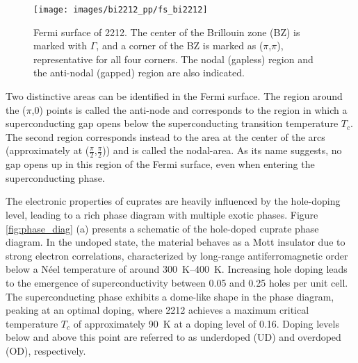 \begin{figure}
	\centering
	\texttt{[image: images/bi2212\_pp/fs\_bi2212]}
	\caption{Fermi surface of 2212. The center of the Brillouin zone (BZ) is marked with $\Gamma$, and a corner of the BZ is marked as ($\pi$,$\pi$), representative for all four corners. The nodal (gapless) region and the anti-nodal (gapped) region are also indicated.}
	\label{fig:fsbi2212}
\end{figure}

Two distinctive areas can be identified in the Fermi surface.
The region around the ($\pi$,$0$) points is called the anti-node and corresponds to the region in which a superconducting gap opens below the superconducting transition temperature $T_c$.
The second region corresponds instead to the area at the center of the arcs (approximately at ($\frac{\pi}{2}$,$\frac{\pi}{2}$)) and is called the nodal-area.
As its name suggests, no gap opens up in this region of the Fermi surface, even when entering the superconducting phase.

The electronic properties of cuprates are heavily influenced by the hole-doping level, leading to a rich phase diagram with multiple exotic phases. Figure \ref{fig:phase_diag} (a) presents a schematic of the hole-doped cuprate phase diagram.
In the undoped state, the material behaves as a Mott insulator due to strong electron correlations, characterized by long-range antiferromagnetic order below a Néel temperature of around \qtyrange{300}{400}{\kelvin}.
Increasing hole doping leads to the emergence of superconductivity between 0.05 and 0.25 holes per unit cell.
The superconducting phase exhibits a dome-like shape in the phase diagram, peaking at an optimal doping, where 2212 achieves a maximum critical temperature $T_c$ of approximately \qty{90}{\kelvin} at a doping level of 0.16.
Doping levels below and above this point are referred to as underdoped (UD) and overdoped (OD), respectively.


